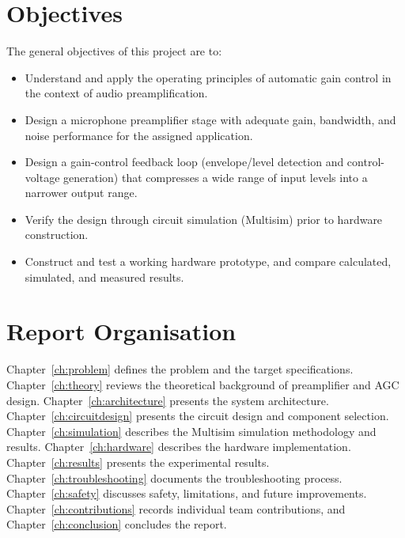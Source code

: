 \section{Objectives}

The general objectives of this project are to:
\begin{itemize}
    \item Understand and apply the operating principles of automatic gain control in the context of audio preamplification.
    \item Design a microphone preamplifier stage with adequate gain, bandwidth, and noise performance for the assigned application.
    \item Design a gain-control feedback loop (envelope/level detection and control-voltage generation) that compresses a wide range of input levels into a narrower output range.
    \item Verify the design through circuit simulation (Multisim) prior to hardware construction.
    \item Construct and test a working hardware prototype, and compare calculated, simulated, and measured results.
\end{itemize}


\section{Report Organisation}

Chapter~\ref{ch:problem} defines the problem and the target specifications. Chapter~\ref{ch:theory} reviews the theoretical background of preamplifier and AGC design. Chapter~\ref{ch:architecture} presents the system architecture. Chapter~\ref{ch:circuitdesign} presents the circuit design and component selection. Chapter~\ref{ch:simulation} describes the Multisim simulation methodology and results. Chapter~\ref{ch:hardware} describes the hardware implementation. Chapter~\ref{ch:results} presents the experimental results. Chapter~\ref{ch:troubleshooting} documents the troubleshooting process. Chapter~\ref{ch:safety} discusses safety, limitations, and future improvements. Chapter~\ref{ch:contributions} records individual team contributions, and Chapter~\ref{ch:conclusion} concludes the report.
